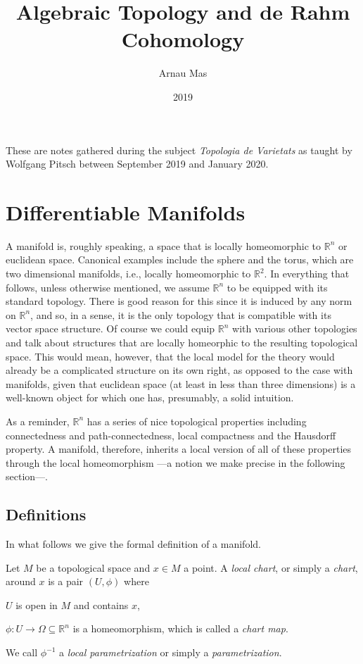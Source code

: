 \documentclass[12pt,oneside]{book}
\title{Algebraic Topology and de Rahm Cohomology}
\author{Arnau Mas}
\date{2019}
\numberwithin{table}{section}
\numberwithin{equation}{section}
\numberwithin{figure}{section}
\newcommand{\R}{\mathbb{R}}
\begin{document}
\maketitle

\frontmatter
\pagestyle{plain}
These are notes gathered during the subject \emph{Topologia de Varietats} as taught by Wolfgang Pitsch between September 2019 and January 2020.

\mainmatter

\chapter{Differentiable Manifolds}

A manifold is, roughly speaking, a space that is locally homeomorphic to \( \R^n \) or euclidean space. Canonical examples include the sphere and the torus, which are two dimensional manifolds, i.e., locally homeomorphic to \( \R^2 \). In everything that follows, unless otherwise mentioned, we assume \( \R^n \) to be equipped with its standard topology. There is good reason for this since it is induced by any norm on \( \R^n \), and so, in a sense, it is the only topology that is compatible with its vector space structure. Of course we could equip \( \R^n \) with various other topologies and talk about structures that are locally homeorphic to the resulting topological space. This would mean, however, that the local model for the theory would already be a complicated structure on its own right, as opposed to the case with manifolds, given that euclidean space (at least in less than three dimensions) is a well-known object for which one has, presumably, a solid intuition.  

As a reminder, \( \R^n \) has a series of nice topological properties including connectedness and path-connectedness, local compactness and the Hausdorff property. A manifold, therefore, inherits a local version of all of these properties through the local homeomorphism ---a notion we make precise in the following section---.

\section{Definitions}
In what follows we give the formal definition of a manifold. 
\begin{defn}
	Let \( M \) be a topological space and \( x \in M \) a point. A \emph{local chart}, or simply a \emph{chart}, around \( x \) is a pair \( (U, \phi) \)  where
	\begin{points}
	\item \( U \) is open in \( M \) and contains \( x \),
	\item \( \phi \colon U \to \Omega \subseteq \R^n \) is a homeomorphism, which is called a \emph{chart map}.
	\end{points}
	We call \( \phi^{-1} \) a \emph{local parametrization} or simply a \emph{parametrization}.
\end{defn}
\end{document}

